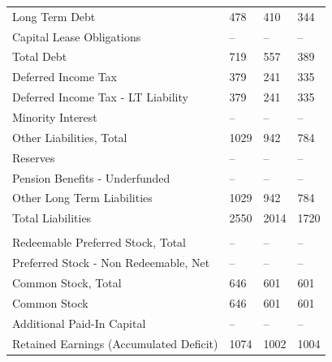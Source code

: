 \documentclass[grad,numbers]{coppe}
\begin{document}
\begin{longtable}[t]{llll}
  Long Term Debt & 478 & 410 & 344\\
  \hspace{1em}\hspace{1em}Capital Lease Obligations & -- & -- & --\\
  \hspace{1em}Total Debt & 719 & 557 & 389\\
  \hspace{1em}Deferred Income Tax & 379 & 241 & 335\\
  \hspace{1em}\hspace{1em}Deferred Income Tax - LT Liability & 379 & 241 & 335\\
  \hspace{1em}Minority Interest & -- & -- & --\\
  \hspace{1em}Other Liabilities, Total & 1029 & 942 & 784\\
  \hspace{1em}\hspace{1em}Reserves & -- & -- & --\\
  \hspace{1em}\hspace{1em}Pension Benefits - Underfunded & -- & -- & --\\
  \hspace{1em}\hspace{1em}Other Long Term Liabilities & 1029 & 942 & 784\\
  \hspace{1em}Total Liabilities & 2550 & 2014 & 1720\\
  \addlinespace[0.3em]
  \multicolumn{4}{l}{\textbf{Shareholders' Equity}}\\
  \hspace{1em}Redeemable Preferred Stock, Total & -- & -- & --\\
  \hspace{1em}Preferred Stock - Non Redeemable, Net & -- & -- & --\\
  \hspace{1em}Common Stock, Total & 646 & 601 & 601\\
  \hspace{1em}\hspace{1em}Common Stock & 646 & 601 & 601\\
  \hspace{1em}Additional Paid-In Capital & -- & -- & --\\
  \hspace{1em}Retained Earnings (Accumulated Deficit) & 1074 & 1002 & 1004\\

\end{longtable}
\end{document}
